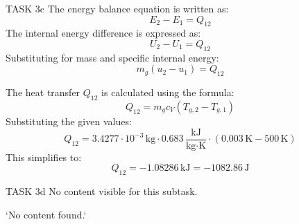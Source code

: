 TASK 3c  
The energy balance equation is written as:  
\[
E_2 - E_1 = Q_{12}
\]  
The internal energy difference is expressed as:  
\[
U_2 - U_1 = Q_{12}
\]  
Substituting for mass and specific internal energy:  
\[
m_g (u_2 - u_1) = Q_{12}
\]  

The heat transfer \( Q_{12} \) is calculated using the formula:  
\[
Q_{12} = m_g c_V (T_{g,2} - T_{g,1})
\]  
Substituting the given values:  
\[
Q_{12} = 3.4277 \cdot 10^{-3} \, \text{kg} \cdot 0.683 \, \frac{\text{kJ}}{\text{kg·K}} \cdot (0.003 \, \text{K} - 500 \, \text{K})
\]  
This simplifies to:  
\[
Q_{12} = -1.08286 \, \text{kJ} = -1082.86 \, \text{J}
\]  

TASK 3d  
No content visible for this subtask.  

`No content found.`